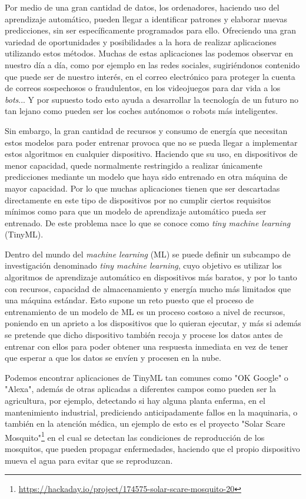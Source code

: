 \documentclass[a4paper, 12pt]{book}
\begin{document}
Por medio de una gran cantidad de datos, los ordenadores, haciendo uso del aprendizaje automático, pueden llegar a identificar patrones y elaborar nuevas predicciones, sin ser específicamente programados para ello. Ofreciendo una gran variedad de oportunidades y posibilidades a la hora de realizar aplicaciones utilizando estos métodos. Muchas de estas aplicaciones las podemos observar en nuestro día a día, como por ejemplo en las redes sociales, sugiriéndonos contenido que puede ser de nuestro interés, en el correo electrónico para proteger la cuenta de correos sospechosos o fraudulentos, en los videojuegos para dar vida a los \textit{bots}... Y por supuesto todo esto ayuda a desarrollar la tecnología de un futuro no tan lejano como pueden ser los coches autónomos o robots más inteligentes.

Sin embargo, la gran cantidad de recursos y consumo de energía que necesitan estos modelos para poder entrenar provoca que no se pueda llegar a implementar estos algoritmos en cualquier dispositivo. Haciendo que su uso, en dispositivos de menor capacidad, quede normalmente restringido a realizar únicamente predicciones mediante un modelo que haya sido entrenado en otra máquina de mayor capacidad. Por lo que muchas aplicaciones tienen que ser descartadas directamente en este tipo de dispositivos por no cumplir ciertos requisitos mínimos como para que un modelo de aprendizaje automático pueda ser entrenado. De este problema nace lo que se conoce como \textit{tiny machine learning} (TinyML)\cite{Warden2020,TinyML}.

Dentro del mundo del \textit{machine learning} (ML) se puede definir un subcampo de investigación denominado \textit{tiny machine learning}, cuyo objetivo es utilizar los algoritmos de aprendizaje automático en dispositivos más baratos, y por lo tanto con recursos, capacidad de almacenamiento y energía mucho más limitados que una máquina estándar. Esto supone un reto puesto que el proceso de entrenamiento de un modelo de ML es un proceso costoso a nivel de recursos, poniendo en un aprieto a los dispositivos que lo quieran ejecutar, y más si además se pretende que dicho dispositivo también recoja y procese los datos antes de entrenar con ellos para poder obtener una respuesta inmediata en vez de tener que esperar a que los datos se envíen y procesen en la nube.

Podemos encontrar aplicaciones de TinyML tan comunes como "OK Google" o "Alexa", además de otras aplicadas a diferentes campos como pueden ser la agricultura, por ejemplo, detectando si hay alguna planta enferma, en el mantenimiento industrial, prediciendo anticipadamente fallos en la maquinaria, o también en la atención médica, un ejemplo de esto es el proyecto "Solar Scare Mosquito"\footnote{\url{https://hackaday.io/project/174575-solar-scare-mosquito-20}} en el cual se detectan las condiciones de reproducción de los mosquitos, que pueden propagar enfermedades, haciendo que el propio dispositivo mueva el agua para evitar que se reproduzcan.
\end{document}
